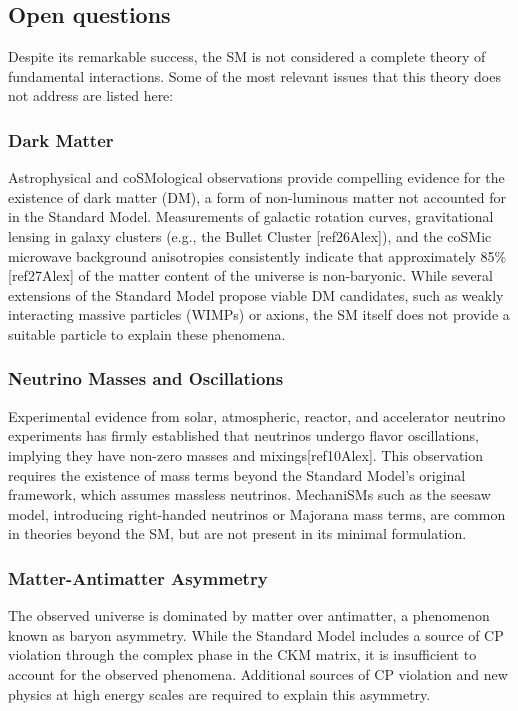 \documentclass[11pt,twoside]{book}
\begin{document}
\subsection*{Open questions}

Despite its remarkable success, the \acrshort{SM} is not considered a complete theory of fundamental interactions. Some of the most relevant issues that this theory does not address are listed here:
\subsubsection*{Dark Matter}

Astrophysical and co\acrshort{SM}ological observations provide compelling evidence for the existence of dark matter (DM), a form of non-luminous matter not accounted for in the Standard Model. Measurements of galactic rotation curves, gravitational lensing in galaxy clusters (e.g., the Bullet Cluster [ref26Alex]), and the co\acrshort{SM}ic microwave background anisotropies consistently indicate that approximately 85\%[ref27Alex] of the matter content of the universe is non-baryonic. While several extensions of the Standard Model propose viable DM candidates, such as weakly interacting massive particles (WIMPs) or axions, the \acrshort{SM} itself does not provide a suitable particle to explain these phenomena.

\subsubsection*{Neutrino Masses and Oscillations}

Experimental evidence from solar, atmospheric, reactor, and accelerator neutrino experiments has firmly established that neutrinos undergo flavor oscillations, implying they have non-zero masses and mixings[ref10Alex]. This observation requires the existence of mass terms beyond the Standard Model's original framework, which assumes massless neutrinos. Mechani\acrshort{SM}s such as the seesaw model, introducing right-handed neutrinos or Majorana mass terms, are common in theories beyond the \acrshort{SM}, but are not present in its minimal formulation.

\subsubsection*{Matter-Antimatter Asymmetry}

The observed universe is dominated by matter over antimatter, a phenomenon known as baryon asymmetry. While the Standard Model includes a source of CP violation through the complex phase in the CKM matrix, it is insufficient to account for the observed phenomena. Additional sources of CP violation and new physics at high energy scales are required to explain this asymmetry.
\end{document}
